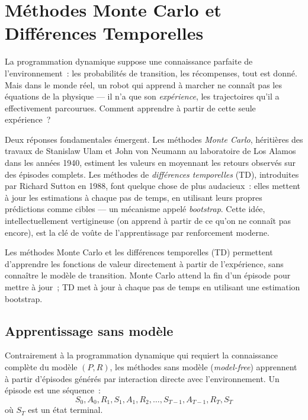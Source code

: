 \chapter{M\'ethodes Monte Carlo et Diff\'erences Temporelles}
\label{ch:monte_carlo}

La programmation dynamique suppose une connaissance parfaite de l'environnement~: les probabilit\'es de transition, les r\'ecompenses, tout est donn\'e. Mais dans le monde r\'eel, un robot qui apprend \`a marcher ne conna\^it pas les \'equations de la physique --- il n'a que son \emph{exp\'erience}, les trajectoires qu'il a effectivement parcourues. Comment apprendre \`a partir de cette seule exp\'erience~?

Deux r\'eponses fondamentales \'emergent. Les m\'ethodes \emph{Monte Carlo}, h\'eriti\`eres des travaux de Stanislaw Ulam et John von Neumann au laboratoire de Los Alamos dans les ann\'ees 1940, estiment les valeurs en moyennant les retours observ\'es sur des \'episodes complets. Les m\'ethodes de \emph{diff\'erences temporelles} (TD), introduites par Richard Sutton en 1988, font quelque chose de plus audacieux~: elles mettent \`a jour les estimations \`a chaque pas de temps, en utilisant leurs propres pr\'edictions comme cibles --- un m\'ecanisme appel\'e \emph{bootstrap}. Cette id\'ee, intellectuellement vertigineuse (on apprend \`a partir de ce qu'on ne conna\^it pas encore), est la cl\'e de vo\^ute de l'apprentissage par renforcement moderne.

\begin{intuition}
Les m\'ethodes Monte Carlo et les diff\'erences temporelles (TD) permettent
d'apprendre les fonctions de valeur directement \`a partir de l'exp\'erience,
sans conna\^itre le mod\`ele de transition. Monte Carlo attend la fin d'un
\'episode pour mettre \`a jour~; TD met \`a jour \`a chaque pas de temps en
utilisant une estimation bootstrap.
\end{intuition}

\section{Apprentissage sans mod\`ele}

Contrairement \`a la programmation dynamique qui requiert la connaissance compl\`ete
du mod\`ele $(P, R)$, les m\'ethodes sans mod\`ele (\emph{model-free}) apprennent
\`a partir d'\'episodes g\'en\'er\'es par interaction directe avec l'environnement.
Un \'episode est une s\'equence~:
\[
    S_0, A_0, R_1, S_1, A_1, R_2, \ldots, S_{T-1}, A_{T-1}, R_T, S_T
\]
o\`u $S_T$ est un \'etat terminal.

